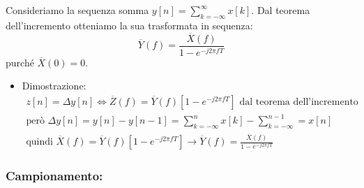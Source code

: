 \documentclass[
]{article}
\providecommand{\tightlist}{%
  \setlength{\itemsep}{0pt}\setlength{\parskip}{0pt}}
\begin{document}
\begin{enumerate}
  Consideriamo la sequenza somma \(y[n]=\sum_{k=-\infty}^{\infty}x[k]\).
  Dal teorema dell'incremento otteniamo la sua trasformata in sequenza:
  \[
  \overline{Y}(f) = \frac{\overline{X}(f)}{1-e^{-j2\pi fT}}
  \] purché \(\overline{X}(0) = 0\).

  \begin{itemize}
  \tightlist
  \item
    Dimostrazione: \begin{gather*}
    z[n] = \Delta y[n] \Longleftrightarrow \overline{Z}(f)=\overline{Y}(f)[1-e^{-j2\pi fT}] \text{ dal teorema dell'incremento} \\
    \text{però } \Delta y[n] = y[n] - y[n-1] = \sum_{k=-\infty}^{n} x[k] - \sum_{k=-\infty}^{n-1} = x[n] \\
    \text{quindi } \overline{X}(f) = \overline{Y}(f)[1-e^{-j2\pi fT}] \to \overline{Y}(f) = \frac{\overline{X}(f)}{1-e^{-j2\pi fT}}
    \end{gather*}
  \end{itemize}
\end{enumerate}

\subsubsection{Campionamento:}\label{campionamento}
\end{document}
